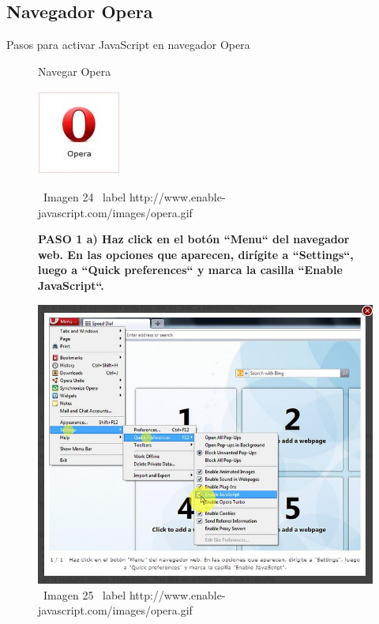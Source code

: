\documentclass[11pt]{article} %
\begin{document}
\newpage
\subsection{Navegador Opera}

Pasos para activar JavaScript en navegador Opera

\begin{figure}
\begin{center}
\begin{center}
Navegar Opera

\end{center}
\begin{center}
\includegraphics[height=3 cm, width=3 cm] {imagenes/opera.jpg}
\end{center}

\ Imagen 24
\ label {http://www.enable-javascript.com/images/opera.gif}
\newline

\begin{center}
\bf PASO 1
a) Haz click en el botón ``Menu`` del navegador web. En las opciones que aparecen, dirígite a ``Settings``, luego a ``Quick preferences`` y marca la casilla ``Enable JavaScript``.
\end{center}
\includegraphics[height=8 cm, width=8 cm] {imagenes/opera 01.jpg}
\newline
\newline
\ Imagen 25
\ label {http://www.enable-javascript.com/images/opera.gif}

\end{center}
\end{figure}
\end{document}
